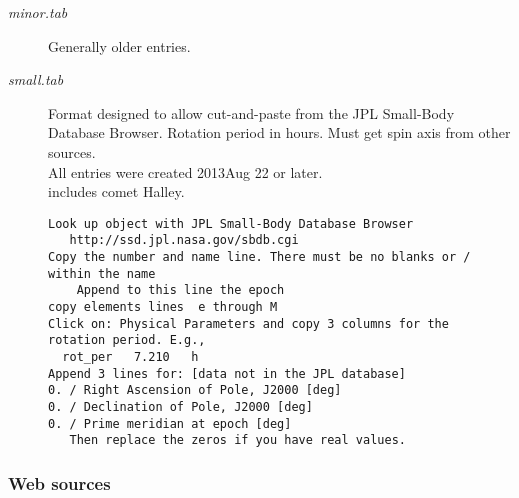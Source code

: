 \documentclass{article}
\newcommand{\qii}{\\ \hspace*{4.em}}     %
\begin{document}
\begin{description} 
 \item [\textit{minor.tab}] Generally older entries.

 \item [\textit{small.tab}]  Format designed to allow cut-and-paste from the JPL Small-Body Database 
Browser. Rotation period in hours. Must get spin axis from other sources.
\\ All entries were created 2013Aug 22 or later.
\qii includes comet Halley.
\begin{verbatim}
Look up object with JPL Small-Body Database Browser  
   http://ssd.jpl.nasa.gov/sbdb.cgi
Copy the number and name line. There must be no blanks or / within the name
    Append to this line the epoch
copy elements lines  e through M
Click on: Physical Parameters and copy 3 columns for the rotation period. E.g.,
  rot_per 	7.210 	h
Append 3 lines for: [data not in the JPL database]
0. / Right Ascension of Pole, J2000 [deg]   
0. / Declination of Pole, J2000 [deg]
0. / Prime meridian at epoch [deg]
   Then replace the zeros if you have real values.
\end{verbatim}

\end{description}

\subsubsection{Web sources} %
\end{document}
